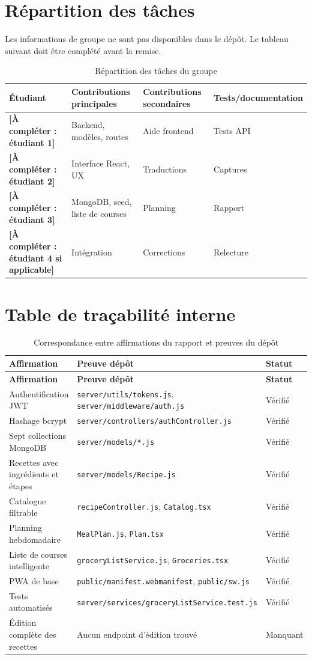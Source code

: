 \documentclass[12pt,a4paper]{report}
\newcommand{\placeholder}[1]{\textbf{[À compléter : #1]}}
\begin{document}
\chapter{Répartition des tâches}
Les informations de groupe ne sont pas disponibles dans le dépôt. Le tableau suivant doit être complété avant la remise.
\begin{table}[H]
\centering
\caption{Répartition des tâches du groupe}
\begin{tabular}{p{3.2cm}p{4.5cm}p{3.5cm}p{3.2cm}}
\toprule
\textbf{Étudiant} & \textbf{Contributions principales} & \textbf{Contributions secondaires} & \textbf{Tests/documentation} \\
\midrule
\placeholder{étudiant 1} & Backend, modèles, routes & Aide frontend & Tests API \\
\placeholder{étudiant 2} & Interface React, UX & Traductions & Captures \\
\placeholder{étudiant 3} & MongoDB, seed, liste de courses & Planning & Rapport \\
\placeholder{étudiant 4 si applicable} & Intégration & Corrections & Relecture \\
\bottomrule
\end{tabular}
\end{table}

\chapter{Table de traçabilité interne}
\begin{longtable}{p{4.5cm}p{6.3cm}p{3.6cm}}
\caption{Correspondance entre affirmations du rapport et preuves du dépôt}\label{tab:evidence}\\
\toprule
\textbf{Affirmation} & \textbf{Preuve dépôt} & \textbf{Statut} \\
\midrule
\endfirsthead
\toprule
\textbf{Affirmation} & \textbf{Preuve dépôt} & \textbf{Statut} \\
\midrule
\endhead
Authentification JWT & \texttt{server/utils/tokens.js}, \texttt{server/middleware/auth.js} & Vérifié \\
Hashage bcrypt & \texttt{server/controllers/authController.js} & Vérifié \\
Sept collections MongoDB & \texttt{server/models/*.js} & Vérifié \\
Recettes avec ingrédients et étapes & \texttt{server/models/Recipe.js} & Vérifié \\
Catalogue filtrable & \texttt{recipeController.js}, \texttt{Catalog.tsx} & Vérifié \\
Planning hebdomadaire & \texttt{MealPlan.js}, \texttt{Plan.tsx} & Vérifié \\
Liste de courses intelligente & \texttt{groceryListService.js}, \texttt{Groceries.tsx} & Vérifié \\
PWA de base & \texttt{public/manifest.webmanifest}, \texttt{public/sw.js} & Vérifié \\
Tests automatisés & \texttt{server/services/groceryListService.test.js} & Vérifié \\
Édition complète des recettes & Aucun endpoint d'édition trouvé & Manquant \\
\bottomrule
\end{longtable}
\end{document}
